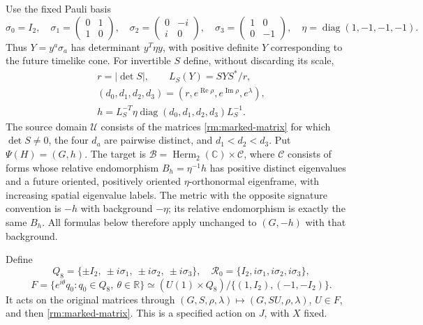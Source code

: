 Use the fixed Pauli basis
\[
 \sigma_0=I_2,\quad \sigma_1=\begin{pmatrix}0&1\\1&0\end{pmatrix},
 \quad\sigma_2=\begin{pmatrix}0&-i\\i&0\end{pmatrix},
 \quad\sigma_3=\begin{pmatrix}1&0\\0&-1\end{pmatrix},
 \quad\eta=\operatorname{diag}(1,-1,-1,-1).
\]
Thus $Y=y^a\sigma_a$ has determinant $y^T\eta y$, with positive
definite $Y$ corresponding to the future timelike cone. For invertible
$S$ define, without discarding its scale,
\begin{equation}\label{rm:metric-map}
 \begin{gathered}
 r=|\det S|,\qquad L_S(Y)=SYS^*/r,\\
 (d_0,d_1,d_2,d_3)=(r,e^{\operatorname{Re}\rho},
                         e^{\operatorname{Im}\rho},e^\lambda),\\
 h=L_S^{-T}\eta\operatorname{diag}(d_0,d_1,d_2,d_3)L_S^{-1}.
 \end{gathered}
\end{equation}
The source domain $\mathcal U$ consists of the matrices
\eqref{rm:marked-matrix} for which $\det S\ne0$, the four $d_a$ are
pairwise distinct, and $d_1<d_2<d_3$. Put $\Psi(H)=(G,h)$.
The target is $\mathcal B=\operatorname{Herm}_2(\mathbb C)\times\mathcal C$,
where $\mathcal C$ consists of forms whose relative endomorphism
$B_h=\eta^{-1}h$ has positive distinct eigenvalues and a future oriented,
positively oriented $\eta$-orthonormal eigenframe, with increasing spatial
eigenvalue labels. The metric with the opposite signature convention is
$-h$ with background $-\eta$; its relative endomorphism is exactly the
same $B_h$. All formulas below therefore apply unchanged to $(G,-h)$
with that background.

Define
\[
 Q_8=\{\pm I_2,\ \pm i\sigma_1,\ \pm i\sigma_2,\ \pm i\sigma_3\},
 \quad\mathcal R_0=\{I_2,i\sigma_1,i\sigma_2,i\sigma_3\},
\]
\begin{equation}\label{rm:compact-group}
 F=\{e^{i\theta}q_0:q_0\in Q_8,\ \theta\in\mathbb R\}
   \simeq (U(1)\times Q_8)/\{(1,I_2),(-1,-I_2)\}.
\end{equation}
It acts on the original matrices through
$(G,S,\rho,\lambda)\mapsto(G,SU,\rho,\lambda)$, $U\in F$,
and then \eqref{rm:marked-matrix}. This is a specified action on $J$,
with $X$ fixed.


